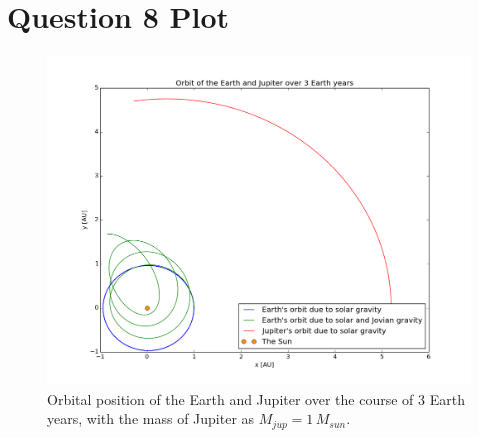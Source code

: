 \documentclass[a4paper,12pt]{article}
\begin{document}
\section{Question 8 Plot}

\begin{figure}[H]
\centering
\includegraphics[width = \linewidth]{lab1q8.png}
\caption{Orbital position of the Earth and Jupiter over the course of 3 Earth years, with the mass of Jupiter as $M_{jup} = 1\, M_{sun}$.}
\label{fig:q8}
\end{figure}
\end{document}
